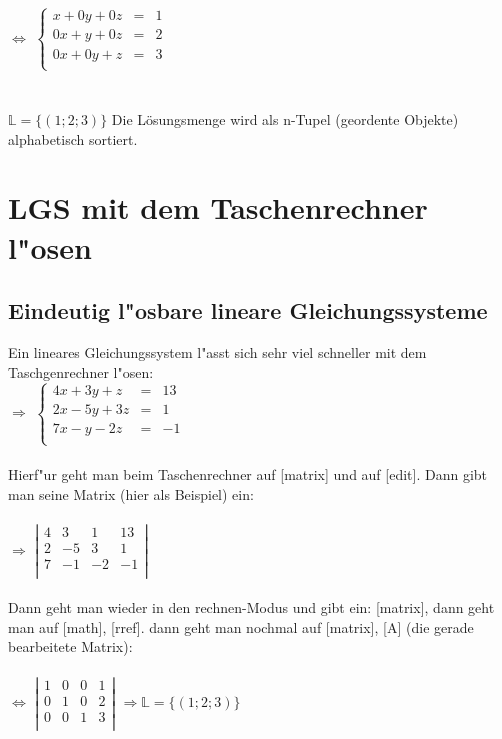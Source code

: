 \documentclass[../MAIN/main.tex]{subfiles}
\begin{document}
\\
\\
$\Leftrightarrow$ $\left\{ \begin{array}{rcl}
x+0y+0z&=&1\\
0x+y+0z&=&2\\
0x+0y+z&=&3\\
\end{array}\right.$\\
\\
\\
$\mathbb{L}=\{(1;2;3) \}$ Die Lösungsmenge wird als n-Tupel (geordente Objekte) alphabetisch sortiert.

	\section{LGS mit dem Taschenrechner l"osen}

	\subsection{Eindeutig l"osbare lineare Gleichungssysteme}

Ein lineares Gleichungssystem l"asst sich sehr viel schneller mit dem Taschgenrechner l"osen:\\

$\Rightarrow$ $\left\{ \begin{array}{rcl}
4x+3y+z&=&13\\
2x-5y+3z& =& 1\\
7x-y-2z&=&-1\\
\end{array}\right.$\\
\\
Hierf"ur geht man beim Taschenrechner auf [matrix] und auf [edit]. Dann gibt man seine Matrix (hier als Beispiel) ein:\\
\\
$\Rightarrow$ $\left\vert \begin{array}{rccl}
4&3&1&13\\
2&-5&3& 1 \\
7&-1&-2&-1\\
\end{array}\right\vert$\\
\\
Dann geht man wieder in den rechnen-Modus und gibt ein:  [matrix], dann geht man auf [math], [rref]. dann geht man nochmal auf [matrix], [A] (die gerade bearbeitete Matrix):\\
\\
$\Leftrightarrow$ $\left\vert \begin{array}{rccl}
1&0&0&1\\
0&1&0&2 \\
0&0&1&3\\
\end{array}\right\vert$ \qquad $\Rightarrow \mathbb{L}=\{(1;2;3) \}$ \\
\end{document}
